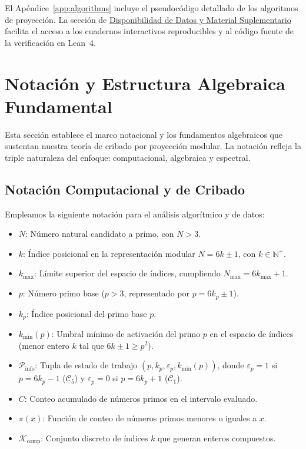 \documentclass{article}
\numberwithin{equation}{section}
\theoremstyle{plain}
\theoremstyle{definition}
\begin{document}
El Apéndice~\ref{app:algorithms} incluye el pseudocódigo detallado de los algoritmos de proyección. La sección de \hyperref[sec:disponibilidad]{Disponibilidad de Datos y Material Suplementario} facilita el acceso a los cuadernos interactivos reproducibles y al código fuente de la verificación en Lean~4.

\section{Notación y Estructura Algebraica Fundamental}
\label{sec:notacion-estructura}

Esta sección establece el marco notacional y los fundamentos algebraicos que sustentan nuestra teoría de cribado por proyección modular. La notación refleja la triple naturaleza del enfoque: computacional, algebraica y espectral.

\subsection{Notación Computacional y de Cribado}

Empleamos la siguiente notación para el análisis algorítmico y de datos:
\begin{itemize}
    \item $N$: Número natural candidato a primo, con $N > 3$.
    \item $k$: Índice posicional en la representación modular $N = 6k \pm 1$, con $k \in \mathbb{N}^+$.
    \item $k_{\max}$: Límite superior del espacio de índices, cumpliendo $N_{\max} = 6k_{\max} + 1$.
    \item $p$: Número primo base ($p > 3$, representado por $p = 6k_p \pm 1$).
    \item $k_p$: Índice posicional del primo base $p$.
    \item $k_{\min}(p)$: Umbral mínimo de activación del primo $p$ en el espacio de índices (menor entero $k$ tal que $6k \pm 1 \ge p^2$).
    \item $\mathcal{P}_{\text{info}}$: Tupla de estado de trabajo $(p, k_p, \varepsilon_p, k_{\min}(p))$, donde $\varepsilon_p = 1$ si $p = 6k_p - 1$ ($\mathcal{C}_5$) y $\varepsilon_p = 0$ si $p = 6k_p + 1$ ($\mathcal{C}_1$).
    \item $C$: Conteo acumulado de números primos en el intervalo evaluado.
    \item $\pi(x)$: Función de conteo de números primos menores o iguales a $x$.
    \item $\mathcal{K}_{\text{comp}}$: Conjunto discreto de índices $k$ que generan enteros compuestos.
\end{itemize}
\end{document}
